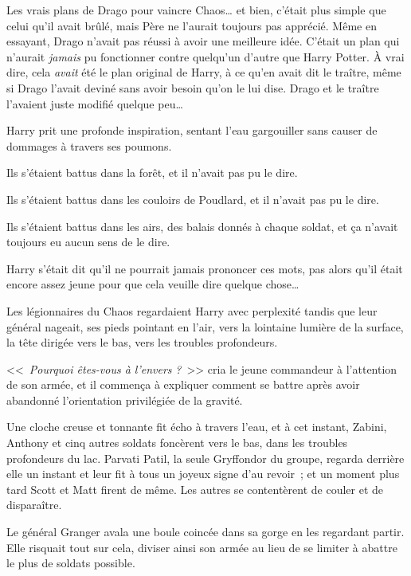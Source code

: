 Les vrais plans de Drago pour vaincre Chaos… et bien, c'était plus simple que celui qu'il avait brûlé, mais Père ne l'aurait toujours pas apprécié. Même en essayant, Drago n'avait pas réussi à avoir une meilleure idée. C'était un plan qui n'aurait \emph{jamais} pu fonctionner contre quelqu'un d'autre que Harry Potter. À vrai dire, cela \emph{avait} été le plan original de Harry, à ce qu'en avait dit le traître, même si Drago l'avait deviné sans avoir besoin qu'on le lui dise. Drago et le traître l'avaient juste modifié quelque peu…

\later

Harry prit une profonde inspiration, sentant l'eau gargouiller sans causer de dommages à travers ses poumons.

Ils s'étaient battus dans la forêt, et il n'avait pas pu le dire.

Ils s'étaient battus dans les couloirs de Poudlard, et il n'avait pas pu le dire.

Ils s'étaient battus dans les airs, des balais donnés à chaque soldat, et ça n'avait toujours eu aucun sens de le dire.

Harry s'était dit qu'il ne pourrait jamais prononcer ces mots, pas alors qu'il était encore assez jeune pour que cela veuille dire quelque chose…

Les légionnaires du Chaos regardaient Harry avec perplexité tandis que leur général nageait, ses pieds pointant en l'air, vers la lointaine lumière de la surface, la tête dirigée vers le bas, vers les troubles profondeurs.

<<~\emph{Pourquoi êtes-vous à l'envers} \emph{?}~>> cria le jeune commandeur à l'attention de son armée, et il commença à expliquer comment se battre après avoir abandonné l'orientation privilégiée de la gravité.

\later

Une cloche creuse et tonnante fit écho à travers l'eau, et à cet instant, Zabini, Anthony et cinq autres soldats foncèrent vers le bas, dans les troubles profondeurs du lac. Parvati Patil, la seule Gryffondor du groupe, regarda derrière elle un instant et leur fit à tous un joyeux signe d'au revoir~; et un moment plus tard Scott et Matt firent de même. Les autres se contentèrent de couler et de disparaître.

Le général Granger avala une boule coincée dans sa gorge en les regardant partir. Elle risquait tout sur cela, diviser ainsi son armée au lieu de se limiter à abattre le plus de soldats possible.


